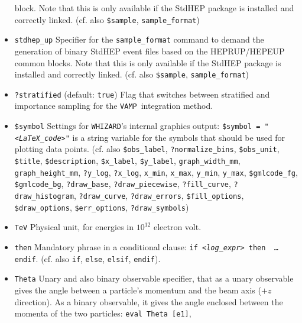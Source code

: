 \documentclass[12pt]{book}
\newcommand{\ttt}[1]{\texttt{#1}}
\newcommand{\whizard}{\texttt{WHIZARD}}
\newcommand{\vamp}{\texttt{VAMP}}
\begin{document}
\begin{itemize}
block. Note that this is only available if the StdHEP package is
installed and correctly linked. (cf. also 
\ttt{\$sample}, \ttt{sample\_format}) 
\item
\ttt{stdhep\_up} \newline 
Specifier for the \ttt{sample\_format} command to demand the
generation of binary StdHEP event files based on the HEPRUP/HEPEUP common
blocks. Note that this is only available if the StdHEP package is
installed and correctly linked. (cf. also 
\ttt{\$sample}, \ttt{sample\_format}) 
\item
\ttt{?stratified} \qquad (default: \ttt{true}) \newline
Flag that switches between stratified and importance sampling for the
\vamp\ integration method.
\item
\ttt{\$symbol} \newline
Settings for \whizard's internal graphics output: \ttt{\$symbol =
"{\em <LaTeX\_code>}"} is a string variable for the symbols that should be
used for plotting data points.  (cf. also  
\ttt{\$obs\_label}, \ttt{?normalize\_bins}, \ttt{\$obs\_unit}, 
\ttt{\$title}, \ttt{\$description}, \ttt{\$x\_label},
\ttt{\$y\_label}, \newline \ttt{graph\_width\_mm}, \ttt{graph\_height\_mm},
\ttt{?y\_log}, \ttt{?x\_log}, \ttt{x\_min}, \ttt{x\_max}, 
\ttt{y\_min}, \ttt{y\_max}, \newline \ttt{\$gmlcode\_fg}, \ttt{\$gmlcode\_bg},
\ttt{?draw\_base}, \ttt{?draw\_piecewise},
\ttt{?fill\_curve}, \newline \ttt{?draw\_histogram}, \ttt{?draw\_curve},
\ttt{?draw\_errors}, \ttt{\$fill\_options},
\ttt{\$draw\_options}, \newline \ttt{\$err\_options}, \ttt{?draw\_symbols})
\item
\ttt{TeV} \newline
Physical unit, for energies in $10^{12}$ electron volt.
\item
\ttt{then} \newline
Mandatory phrase in a conditional clause: \ttt{if {\em <log\_expr>} then
  {\em <expr 1>} \ldots endif}. (cf. also \ttt{if}, \ttt{else}, \ttt{elsif},
\ttt{endif}).
\item
\ttt{Theta} \newline
Unary and also binary observable specifier, that as a unary observable
gives the angle between a particle's momentum and the beam axis ($+z$
direction). As a binary observable, it gives the angle enclosed
between the momenta of the two particles: \ttt{eval Theta [e1]},

\end{itemize}
\end{document}
